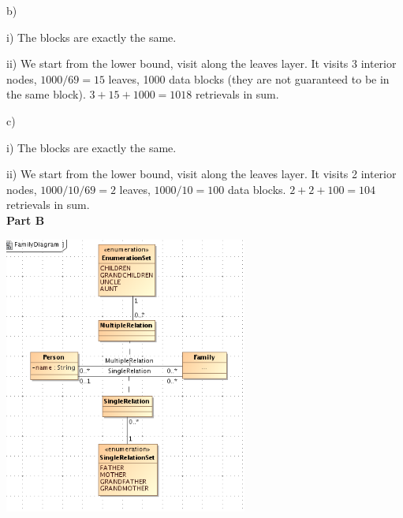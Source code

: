 \documentclass[12pt]{article}
\begin{document}
b)

i) The blocks are exactly the same.

ii) We start from the lower bound, visit along the leaves layer. It visits 3 interior nodes, $1000/69=15$ leaves, 1000 data blocks (they are not guaranteed to be in the same block). $3+15+1000=1018$ retrievals in sum.

c)

i) The blocks are exactly the same.

ii) We start from the lower bound, visit along the leaves layer. It visits 2 interior nodes, $1000/10/69=2$ leaves, $1000/10=100$ data blocks. $2+2+100=104$ retrievals in sum.
\\

\textbf{Part B}

\includegraphics[width=80mm]{family.png}
\end{document}
